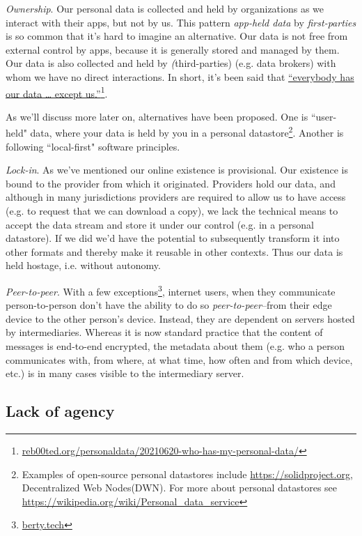 \documentclass[11pt, oneside]{article}   	%
\newcommand{\hyperfootnote}[1][]{\def\ArgI{{#1}}\hyperfootnoteRelay}
\newcommand\hyperfootnoteRelay[2][]{\href{#1#2}{\ArgI}\footnote{\href{#1#2}{#2}}}
\begin{document}
\emph{Ownership}. Our personal data is collected and held by organizations as we interact with their apps, but not by us. This pattern \emph{app-held data} by \emph{first-parties} is so common that it's hard to imagine an alternative. Our data is not free from external control by apps, because it is generally stored and managed by them. Our data is also collected and held by \emph(third-parties) (e.g. data brokers) with whom we have no direct interactions. In short, it's been said that \hyperfootnote[“everybody has our data … except us.”][https://]{reb00ted.org/personaldata/20210620-who-has-my-personal-data/}. 

As we'll discuss more later on, alternatives have been proposed. One is ``user-held" data\cite{Jurcys2021}, where your data is held by you in a personal datastore\footnote{Examples of open-source personal datastores include \url{https://solidproject.org}, Decentralized Web Nodes(DWN). For more about personal datastores see \url{https://wikipedia.org/wiki/Personal\_data\_service}}. Another is following ``local-first" software principles.\cite{Kleppmann2019}

\emph{Lock-in}. As we've mentioned our online existence is provisional. Our existence is bound to the provider from which it originated. Providers hold our data, and although in many jurisdictions providers are required to allow us to have access (e.g. to request that we can download a copy), we lack the technical means to accept the data stream and store it under our control (e.g. in a personal datastore). If we did we'd have the potential to subsequently transform it into other formats and thereby make it reusable in other contexts. Thus our data is held hostage, i.e. without autonomy. 

\emph{Peer-to-peer}. With a few exceptions\hyperfootnote[][https://]{berty.tech}, internet users, when they communicate person-to-person don't have the ability to do so \emph{peer-to-peer}--from their edge device to the other person's device. Instead, they are dependent on servers hosted by intermediaries. Whereas it is now standard practice that the content of messages is end-to-end encrypted, the metadata about them (e.g. who a person communicates with, from where, at what time, how often and from which device, etc.) is in many cases visible to the intermediary server. 

\subsection{Lack of agency}
\end{document}
